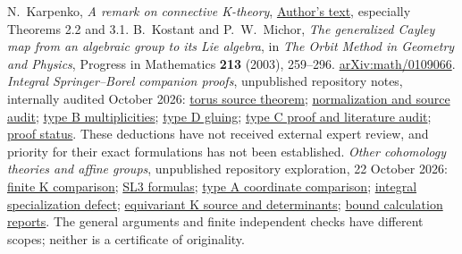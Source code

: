 \documentclass[11pt,letterpaper]{article}
\theoremstyle{definition}\newtheorem{definition}[theorem]{Definition}
\newcommand{\record}[2]{\href{https://github.com/sean-rogers-t/Sage-programs/blob/2bc20702f142d6124a22ab97aaa511caf227f916/borel/#1}{#2}}
\begin{document}
\begin{thebibliography}{99}
N.~Karpenko, \emph{A remark on connective K-theory},
\href{https://sites.ualberta.ca/~karpenko/publ/connective.pdf}{Author's text},
especially Theorems 2.2 and 3.1.
B.~Kostant and P.~W.~Michor, \emph{The generalized Cayley map from an
algebraic group to its Lie algebra}, in \emph{The Orbit Method in Geometry
and Physics}, Progress in Mathematics \textbf{213} (2003), 259--296.
\href{https://arxiv.org/abs/math/0109066}{arXiv:math/0109066}.
\emph{Integral Springer--Borel companion proofs}, unpublished repository
notes, internally audited October 2026:
\record{TRACE_SOURCE_THEOREM.md}{torus source theorem};
\record{INTEGRAL_LITERATURE.md}{normalization and source audit};
\record{TYPE_B_GENERAL_SMITH.md}{type B multiplicities};
\record{TYPE_D_EVEN_GLUING_THEOREM.md}{type D gluing};
\record{TYPE_C_JOINT_AUDIT.md}{type C proof and literature audit};
\record{PROOF_STATUS.md}{proof status}.
These deductions have not received external expert review, and priority
for their exact formulations has not been established.
\emph{Other cohomology theories and affine groups}, unpublished repository
exploration, 22 October 2026:
\record{OTHER_THEORIES_FINITE.md}{finite K comparison};
\record{OTHER_THEORIES_SL3.md}{SL3 formulas};
\record{OTHER_THEORIES_TYPE_A.md}{type A coordinate comparison};
\record{EQUIVARIANT_IMAGE_PILOT.md}{integral specialization defect};
\record{OTHER_THEORIES_EQUIVARIANT_K.md}{equivariant K source and determinants};
\record{other-theories-verification.json}{bound calculation reports}.
The general arguments and finite independent checks have different scopes;
neither is a certificate of originality.
\end{thebibliography}
\end{document}
